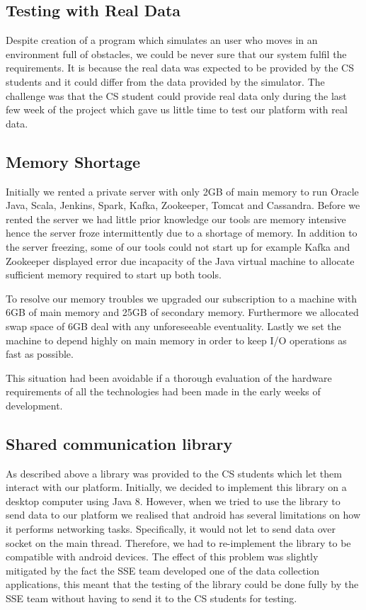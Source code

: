 \documentclass[prodmode,acmtosem]{acmsmall} %
\begin{document}
\subsection{Testing with Real Data}
Despite creation of a program which simulates an user who moves in an environment full of obstacles, we could be never sure that our system fulfil the requirements. It is because the real data was expected to be provided by the CS students and it could differ from the data provided by the simulator. The challenge was that the CS student could provide real data only during the last few week of the project which gave us little time to test our platform with real data. 

\subsection{Memory Shortage}
Initially we rented a private server with only 2GB of main memory to run Oracle Java, Scala, Jenkins, Spark, Kafka, Zookeeper, Tomcat and Cassandra. Before we rented the server we had little prior knowledge our tools are memory intensive hence the server froze intermittently due to a shortage of memory. In addition to the server freezing, some of our tools could not start up for example Kafka and Zookeeper displayed error due incapacity of the Java virtual machine to allocate sufficient memory required to start up both tools. 

To resolve our memory troubles we upgraded our subscription to a machine with 6GB of main memory and 25GB of secondary memory. Furthermore we allocated swap space of 6GB deal with any unforeseeable eventuality. Lastly we set the machine to depend highly on main memory in order to keep I/O operations as fast as possible.

This situation had been avoidable if a thorough evaluation of the hardware requirements of all the technologies had been made in the early weeks of development.

\subsection{Shared communication library}
As described above a library was provided to the CS students which let them interact with our platform. Initially, we decided to implement this library on a desktop computer using Java 8. However, when we tried to use the library to send data to our platform we realised that android has several limitations on how it performs networking tasks. Specifically, it would not let to send data over socket on the main thread. Therefore, we had to re-implement the library to be compatible with android devices. The effect of this problem was slightly mitigated by the fact the SSE team developed one of the data collection applications, this meant that the testing of the library could be done fully by the SSE team without having to send it to the CS students for testing.
\end{document}
